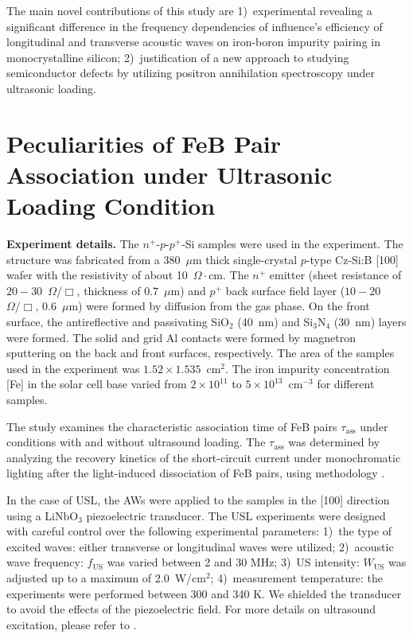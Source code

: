 \documentclass{ttp}
\begin{document}
The main novel contributions of this study are
1)~experimental revealing a significant difference in the frequency dependencies
of influence's efficiency of longitudinal and transverse acoustic waves on iron-boron impurity pairing in monocrystalline silicon;
2)~justification of a new approach to studying semiconductor defects by utilizing positron annihilation spectroscopy under ultrasonic loading.

\section{Peculiarities of FeB Pair Association under Ultrasonic Loading Condition}

\noindent \textbf{Experiment details.}
The $n^+$-$p$-$p^+$-Si samples were used in the experiment.
The structure was fabricated from a 380~$\mu$m thick single-crystal
$p$-type Cz-Si:B [100] wafer
with the resistivity of about 10~$\Omega\cdot$cm.
The $n^+$ emitter (sheet resistance of $20-30$~$\Omega/\Box$,
thickness of $0.7$~$\mu$m) and $p^+$ back surface field layer ($10-20$~$\Omega/\Box$, $0.6$~$\mu$m) were formed by diffusion from the gas phase.
On the front surface, the antireflective and passivating SiO$_2$ (40~nm) and Si$_3$N$_4$ (30~nm) layers
were formed.
The solid and grid Al contacts were formed by magnetron sputtering on the back and front surfaces, respectively.
The area of the samples used in the experiment was $1.52\times1.535$~cm$^2$.
The iron impurity concentration [Fe] in the solar cell base varied from $2\times10^{11}$ to $5\times10^{13}$~cm$^{-3}$ for different samples.

The study examines the characteristic association time of FeB pairs $\tau_\mathrm{ass}$ under conditions with and without ultrasound loading.
The $\tau_\mathrm{ass}$ was determined by analyzing the recovery kinetics of the  short-circuit current under monochromatic lighting
after  the light-induced dissociation of FeB pairs, using methodology \cite{Olikh2021JAP, Olikh2022:JMatSci}.

In the case of USL, the AWs were applied to the samples in the [100] direction using a LiNbO$_3$ piezoelectric transducer.
The USL experiments were designed with careful control over the following experimental parameters:
1)~the type of excited waves: either transverse or longitudinal waves were utilized;
2)~acoustic wave frequency: $f_\mathrm{US}$ was varied between 2 and 30 MHz;
3)~US intensity: $W_\mathrm{US}$ was adjusted up to a maximum of 2.0~W/cm$^2$;
4)~measurement temperature: the experiments were performed between 300 and 340 K.
We shielded the transducer to avoid the effects of the piezoelectric field.
For more details on ultrasound excitation, please refer to \cite{Olikh2021JAP, Olikh2022:JMatSci}.
\end{document}
